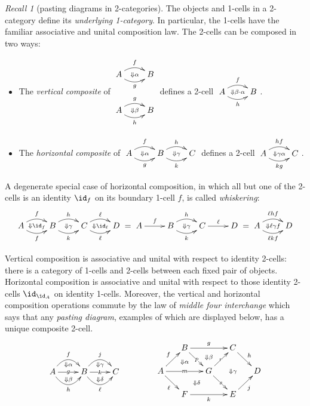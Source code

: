 \documentclass[12pt,reqno]{amsart}
\theoremstyle{plain}
\theoremstyle{definition}
\theoremstyle{remark}
\newtheorem{rec}[thm]{Recall}
\numberwithin{equation}{subsection}
\begin{document}
\begin{rec}[pasting diagrams in 2-categories]
The objects and 1-cells in a 2-category define its \emph{underlying 1-category}. In particular, the 1-cells have the familiar associative and unital composition law. The 2-cells can be composed in two ways:
\begin{itemize}
\item The \emph{vertical composite} of  $\vcenter{\xymatrix@R=30pt{  A \ar@/^2ex/[r]^f \ar@/_2ex/[r]_g \ar@{}[r]|{\Downarrow\alpha}& B \\  A \ar@/^2ex/[r]^g \ar@/_2ex/[r]_h \ar@{}[r]|{\Downarrow\beta}& B}}$ defines a 2-cell $\xymatrix{  A \ar@/^2ex/[r]^f \ar@/_2ex/[r]_h \ar@{}[r]|{\Downarrow\beta\cdot\alpha}& B}$.

\item The \emph{horizontal composite} of  $ \xymatrix{  A \ar@/^2ex/[r]^f \ar@/_2ex/[r]_g \ar@{}[r]|{\Downarrow\alpha}& B \ar@/^2ex/[r]^h \ar@/_2ex/[r]_k \ar@{}[r]|{\Downarrow\gamma} & C}$  defines a 2-cell $\xymatrix{ A \ar@/^2ex/[r]^{hf} \ar@/_2ex/[r]_{kg} \ar@{}[r]|{\Downarrow\gamma\alpha}& C}$.
\end{itemize}
A degenerate special case of horizontal composition, in which all but one of the 2-cells is an identity $\id_f$ on its boundary 1-cell $f$, is called \emph{whiskering}: 
\[ \vcenter{\xymatrix{  A \ar@/^2ex/[r]^f \ar@/_2ex/[r]_f \ar@{}[r]|{\Downarrow\id_f}& B \ar@/^2ex/[r]^h \ar@/_2ex/[r]_k \ar@{}[r]|{\Downarrow\gamma} & C \ar@/^2ex/[r]^\ell \ar@/_2ex/[r]_\ell \ar@{}[r]|{\Downarrow\id_{\ell}} & D} } =  \vcenter{\xymatrix{  A \ar[r]^f & B \ar@/^2ex/[r]^h \ar@/_2ex/[r]_k \ar@{}[r]|{\Downarrow\gamma} & C \ar[r]^\ell & D} } =  \vcenter{\xymatrix{   A \ar@/^2ex/[r]^{\ell hf} \ar@/_2ex/[r]_{\ell kf} \ar@{}[r]|{\Downarrow\ell \gamma f} & D} }\]

Vertical composition is associative and unital with respect to identity 2-cells:  there is a category of 1-cells and 2-cells between each fixed pair of objects. Horizontal composition is associative and unital with respect to those identity 2-cells $\id_{\id_A}$ on identity 1-cells. Moreover, the vertical and horizontal composition operations commute by the law of \emph{middle four interchange} which says that any \emph{pasting diagram}, examples of which are displayed below, has a unique composite 2-cell.
\[ \vcenter{\xymatrix{ A \ar@/^3.5ex/[r]^f_{\Downarrow\alpha} \ar[r]|g \ar@/_3.5ex/[r]_h^{\Downarrow\beta} & B  \ar@/^3.5ex/[r]^j_{\Downarrow\gamma} \ar[r]|k \ar@/_3.5ex/[r]_\ell^{\Downarrow\delta} & C}}
\qquad\qquad \vcenter{\xymatrix@=15pt{  & B \ar[rr]^g \ar@{}[d]|(.6){\Downarrow\alpha} \ar[dr]|p & \ar@{}[d]|(.4){\Downarrow\beta} & C \ar@{}[dd]|{\Downarrow\gamma} \ar[dr]^h \\ A \ar[ur]^f \ar[dr]_\ell \ar[rr]|m & \ar@{}[dr]|{\Downarrow\delta} & G \ar[ur]|r \ar[dr]|s & & D \\ & F \ar[rr]_k & & E \ar[ur]_j}}
\]
\end{rec}
\end{document}
